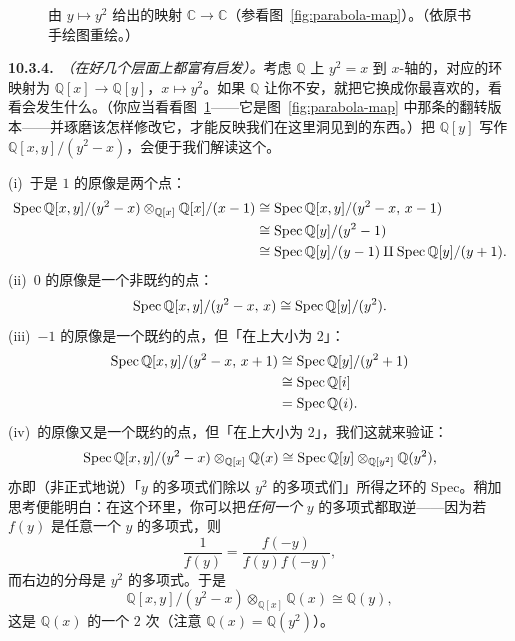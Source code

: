 \begin{figure}[htbp]
\centering
{}
\caption{由 $y\mapsto y^2$ 给出的映射 $\mathbb{C}\to\mathbb{C}$（参看图~\ref{fig:parabola-map}）。（依原书手绘图重绘。）}\label{fig:y-squared-map}
\end{figure}

\textbf{10.3.4.}\ \emph{\trhExample{}（在好几个层面上都富有启发）。}\quad 考虑 $\mathbb{Q}$ 上\trParabola{} $y^2=x$ 到 $x$-轴的\trProjection，对应的环映射为 $\mathbb{Q}[x]\to\mathbb{Q}[y]$，$x\mapsto y^2$。如果 $\mathbb{Q}$ 让你不安，就把它换成你最喜欢的\trField，看看会发生什么。（你应当看看图~\ref{fig:y-squared-map}——它是图~\ref{fig:parabola-map} 中那条\trParabola{}的翻转版本——并琢磨该怎样修改它，才能反映我们在这里洞见到的东西。）把 $\mathbb{Q}[y]$ 写作 $\mathbb{Q}[x,y]/(y^2-x)$，会便于我们解读这个\trMorphism。

(i)~于是 $1$ 的原像是两个点：
\[
\begin{aligned}
\operatorname{Spec}\mathbb{Q}[x,y]/(y^2-x)\otimes_{\mathbb{Q}[x]}\mathbb{Q}[x]/(x-1)&\cong\operatorname{Spec}\mathbb{Q}[x,y]/(y^2-x,\,x-1)\\
&\cong\operatorname{Spec}\mathbb{Q}[y]/(y^2-1)\\
&\cong\operatorname{Spec}\mathbb{Q}[y]/(y-1)\amalg\operatorname{Spec}\mathbb{Q}[y]/(y+1).
\end{aligned}
\]
(ii)~$0$ 的原像是一个非既约的点：
\[
\operatorname{Spec}\mathbb{Q}[x,y]/(y^2-x,\,x)\cong\operatorname{Spec}\mathbb{Q}[y]/(y^2).
\]
(iii)~$-1$ 的原像是一个既约的点，但「在\trBaseField{}上大小为 $2$」：
\[
\begin{aligned}
\operatorname{Spec}\mathbb{Q}[x,y]/(y^2-x,\,x+1)&\cong\operatorname{Spec}\mathbb{Q}[y]/(y^2+1)\\
&\cong\operatorname{Spec}\mathbb{Q}[i]\\
&=\operatorname{Spec}\mathbb{Q}(i).
\end{aligned}
\]
(iv)~\trGenericPoint{}的原像又是一个既约的点，但「在\trResidueField{}上大小为 $2$」，我们这就来验证：
\[
\operatorname{Spec}\mathbb{Q}[x,y]/(y^2-x)\otimes_{\mathbb{Q}[x]}\mathbb{Q}(x)\cong\operatorname{Spec}\mathbb{Q}[y]\otimes_{\mathbb{Q}[y^2]}\mathbb{Q}(y^2),
\]
亦即（非正式地说）「$y$ 的多项式们除以 $y^2$ 的多项式们」所得之环的 Spec。稍加思考便能明白：在这个环里，你可以把\emph{任何一个} $y$ 的多项式都取逆——因为若 $f(y)$ 是任意一个 $y$ 的多项式，则
\[
\frac{1}{f(y)}=\frac{f(-y)}{f(y)f(-y)},
\]
而右边的分母是 $y^2$ 的多项式。于是
\[
\mathbb{Q}[x,y]/(y^2-x)\otimes_{\mathbb{Q}[x]}\mathbb{Q}(x)\cong\mathbb{Q}(y),
\]
这是 $\mathbb{Q}(x)$ 的一个 $2$ 次\trFieldExtension（注意 $\mathbb{Q}(x)=\mathbb{Q}(y^2)$）。

